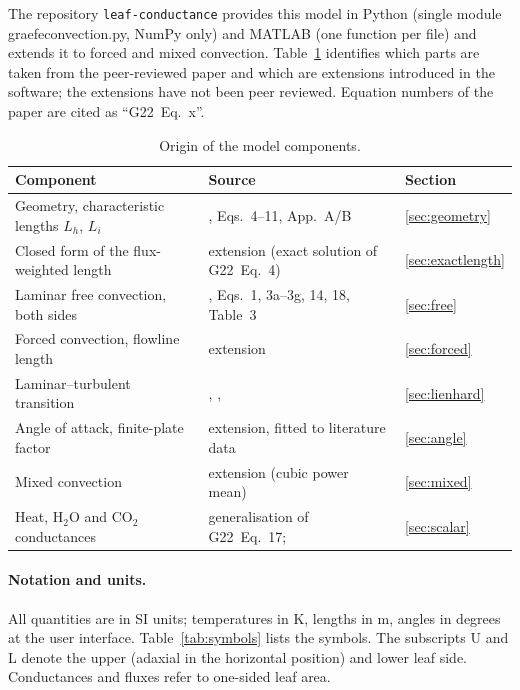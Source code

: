 \documentclass[11pt,a4paper]{article}
\newcommand{\codeus}{\char95\allowbreak}
\DeclareRobustCommand{\code}[1]{\textnormal{\ttfamily\let\_\codeus #1}}
\newcommand{\Gtt}[1]{G22~Eq.~#1}
\begin{document}
The repository \texttt{leaf-conductance} provides this model in Python (single module \code{graefe\_convection.py}, NumPy only) and MATLAB (one function per file) and extends it to forced and mixed convection. Table~\ref{tab:origin} identifies which parts are taken from the peer-reviewed paper and which are extensions introduced in the software; the extensions have not been peer reviewed. Equation numbers of the paper are cited as ``\Gtt{x}''.

\begin{table}[ht]
\centering\small
\caption{Origin of the model components.}\label{tab:origin}
\begin{tabularx}{\textwidth}{>{\raggedright\arraybackslash}p{4.9cm}>{\raggedright\arraybackslash}X l}
\toprule
Component & Source & Section \\
\midrule
Geometry, characteristic lengths $L_h$, $L_i$ & \citet{graefe2022}, Eqs.~4--11, App.~A/B & \ref{sec:geometry} \\
Closed form of the flux-weighted length & extension (exact solution of \Gtt{4}) & \ref{sec:exactlength} \\
Laminar free convection, both sides & \citet{graefe2022}, Eqs.~1, 3a--3g, 14, 18, Table~3 & \ref{sec:free} \\
Forced convection, flowline length & extension & \ref{sec:forced} \\
Laminar--turbulent transition & \citet{lienhard2020}, \citet{mayle1991}, \citet{kottke1977} & \ref{sec:lienhard} \\
Angle of attack, finite-plate factor & extension, fitted to literature data & \ref{sec:angle} \\
Mixed convection & extension (cubic power mean) & \ref{sec:mixed} \\
Heat, H$_2$O and CO$_2$ conductances & generalisation of \Gtt{17}; \citet{massman1998} & \ref{sec:scalar} \\
\bottomrule
\end{tabularx}
\end{table}

\paragraph{Notation and units.} All quantities are in SI units; temperatures in K, lengths in m, angles in degrees at the user interface. Table~\ref{tab:symbols} lists the symbols. The subscripts U and L denote the upper (adaxial in the horizontal position) and lower leaf side. Conductances and fluxes refer to one-sided leaf area.
\end{document}

